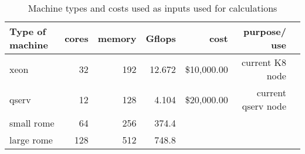 \tiny \begin{longtable} { |p{}  |r  |r  |r  |r  |r  |r |} 
\caption{Machine types and costs used as inputs used for calculations \label{tab:Machines}}\\ 
\hline 
{Type of machine }&{cores}&{memory}&{Gflops }&{cost }&{purpose/ use } \\ \hline
{xeon }&{32}&{192}&{12.672}&{\$10,000.00}&{current K8 node } \\ \hline
{qserv }&{12}&{128}&{4.104}&{\$20,000.00}&{current qserv node } \\ \hline
{small rome  }&{64}&{256}&{374.4}&& \\ \hline
{large rome }&{128}&{512}&{748.8}&& \\ \hline
\end{longtable} \normalsize
